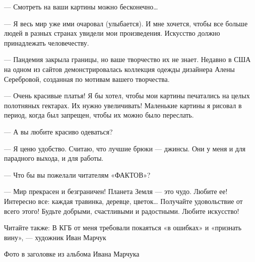 — Смотреть на ваши картины можно бесконечно…

— Я весь мир уже ими очаровал (улыбается). И мне хочется, чтобы все больше
людей в разных странах увидели мои произведения. Искусство должно
принадлежать человечеству.

— Пандемия закрыла границы, но ваше творчество их не знает. Недавно в США
на одном из сайтов демонстрировалась коллекция одежды дизайнера Алены
Серебровой, созданная по мотивам вашего творчества.

— Очень красивые платья! Я бы хотел, чтобы мои картины печатались на целых
полотняных гектарах. Их нужно увеличивать! Маленькие картины я рисовал
в период, когда был запрещен, чтобы их можно было переслать.

— А вы любите красиво одеваться?

— Я ценю удобство. Считаю, что лучшие брюки — джинсы. Они у меня и для
парадного выхода, и для работы.

— Что бы вы пожелали читателям «ФАКТОВ»?

— Мир прекрасен и безграничен! Планета Земля — это чудо. Любите ее!
Интересно все: каждая травинка, деревце, цветок… Получайте удовольствие
от всего этого! Будьте добрыми, счастливыми и радостными. Любите
искусство!

Читайте также: В КГБ от меня требовали покаяться «в ошибках» и «признать
вину», — художник Иван Марчук

Фото в заголовке из альбома Ивана Марчука


